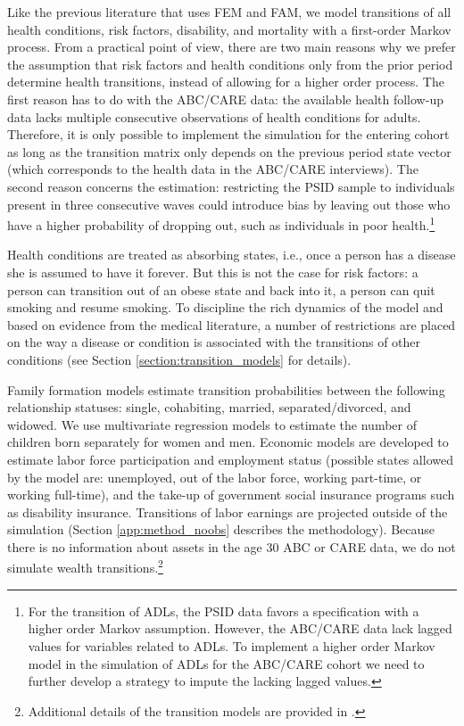 \noindent Like the previous literature that uses FEM and FAM, we model transitions of all health conditions, risk factors, disability, and mortality with a first-order Markov process. From a practical point of view, there are two main reasons why we prefer the assumption that risk factors and health conditions only from the prior period determine health transitions, instead of allowing for a higher order process. The first reason has to do with the ABC/CARE data: the available health follow-up data lacks multiple consecutive observations of health conditions for adults. Therefore, it is only possible to implement the simulation for the entering cohort as long as the transition matrix only depends on the previous period state vector (which corresponds to the health data in the ABC/CARE interviews). The second reason concerns the estimation: restricting the PSID sample to individuals present in three consecutive waves could introduce bias by leaving out those who have a higher probability of dropping out, such as individuals in poor health.\footnote{For the transition of ADLs, the PSID data favors a specification with a higher order Markov assumption. However, the ABC/CARE data lack lagged values for variables related to ADLs. To implement a higher order Markov model in the simulation of ADLs for the ABC/CARE cohort we need to further develop a strategy to impute the lacking lagged values.} 

\noindent Health conditions are treated as absorbing states, i.e., once a person has a disease she is assumed to have it forever. But this is not the case for risk factors: a person can transition out of an obese state and back into it, a person can quit smoking and resume smoking. To discipline the rich dynamics of the model and based on evidence from the medical literature, a number of restrictions are placed on the way a disease or condition is associated with the transitions of other conditions (see Section \ref{section:transition_models} for details).  

\noindent Family formation models estimate transition probabilities between the following relationship statuses:  single, cohabiting, married, separated/divorced, and widowed. We use multivariate regression models to estimate the number of children born separately for women and men. Economic models are developed to estimate labor force participation and employment status (possible states allowed by the model are: unemployed, out of the labor force, working part-time, or working full-time), and the take-up of government social insurance programs such as disability insurance. 
Transitions of labor earnings are projected outside of the simulation (Section \ref{app:method_noobs} describes the methodology).  Because there is no information about assets in the age 30 ABC or CARE data, we do not simulate wealth transitions.\footnote{Additional details of the transition models are provided in \citet{Goldman_etal_2015_Future-America-Model}.} 

